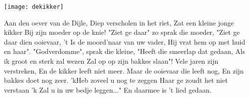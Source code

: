 \begin{intersong}
    \texttt{[image: dekikker]}
\end{intersong}
\beginverse
Aan den oever van de Dijle,
Diep verscholen in het riet,
Zat een kleine jonge kikker
Bij zijn moeder op de knie!
\endverse
\beginverse
"Ziet ge daar" zo sprak die moeder,
"Ziet ge daar dien ooievaar,
't Is de moord'naar van uw vader,
Hij vrat hem op met huid en haar".
\endverse
\beginverse
"Godverdomme", sprak die kleine,
"Heeft die smeerlap dat gedaan,
Als ik groot en sterk zal wezen
Zal op op zijn bakkes slaan"!
\endverse
\beginverse
Vele jaren zijn verstreken,
En de kikker leeft niet meer.
Maar de ooievaar die leeft nog,
En zijn bakkes doet nog zeer.
\endverse
\beginverse
'kHeb zoveel u nog te zeggen
Haar ge zoudt het niet verstaan
'k Zal u in uw bedje leggen..."
En daarmee is 't lied gedaan.
\endverse
\endsong